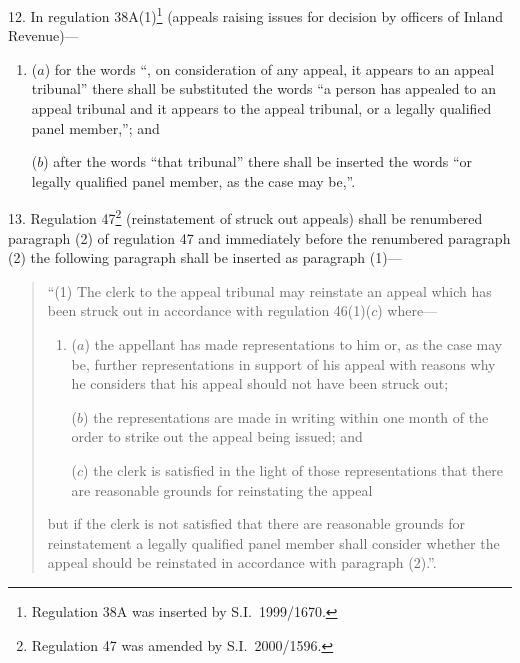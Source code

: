 \documentclass[12pt,a4paper]{article}
\begin{document}
\medskip

12.  In regulation 38A(1)\footnote{Regulation 38A was inserted by S.I.\ 1999/1670.} (appeals raising issues for decision by officers of Inland Revenue)—
\begin{enumerate}\item[]
($a$) for the words “, on consideration of any appeal, it appears to an appeal tribunal” there shall be substituted the words “a person has appealed to an appeal tribunal and it appears to the appeal tribunal, or a legally qualified panel member,”; and

($b$) after the words “that tribunal” there shall be inserted the words “or legally qualified panel member, as the case may be,”.
\end{enumerate}

\medskip

13.  Regulation 47\footnote{Regulation 47 was amended by S.I.\ 2000/1596.} (reinstatement of struck out appeals) shall be renumbered paragraph (2) of regulation 47 and immediately before the renumbered paragraph (2) the following paragraph shall be inserted as paragraph (1)—
\begin{quotation}
“(1) The clerk to the appeal tribunal may reinstate an appeal which has been struck out in accordance with regulation 46(1)($c$)  where—
\begin{enumerate}\item[]
($a$) the appellant has made representations to him or, as the case may be, further representations in support of his appeal with reasons why he considers that his appeal should not have been struck out;

($b$) the representations are made in writing within one month of the order to strike out the appeal being issued; and

($c$) the clerk is satisfied in the light of those representations that there are reasonable grounds for reinstating the appeal
\end{enumerate}
but if the clerk is not satisfied that there are reasonable grounds for reinstatement a legally qualified panel member shall consider whether the appeal should be reinstated in accordance with paragraph (2).”.
\end{quotation}

\medskip
\end{document}
